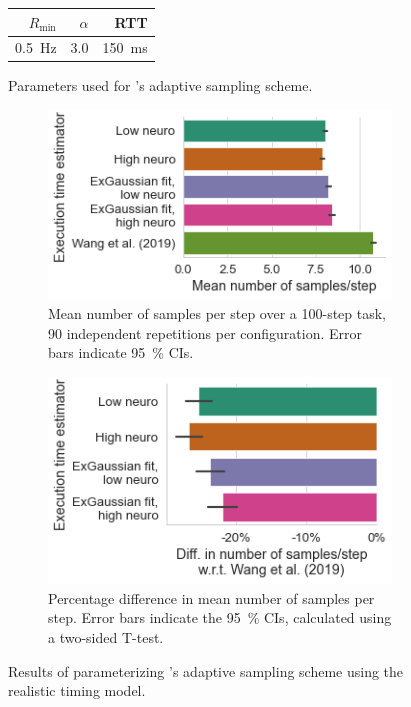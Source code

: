 \begin{figure}
    \centering
    \begin{subtable}[]{\columnwidth}
        \centering
        \begin{tabular}{rrr}
            \toprule
            \( R_\text{min} \) & \( \alpha \) & \ac{RTT} \\
            \midrule
            \SI{0.5}{\hertz} & \num{3.0} & \SI{150}{\milli\second} \\
            \bottomrule
        \end{tabular}
        \caption{Parameters used for \textcite{Wang2019Towards}'s adaptive sampling scheme.}
    \end{subtable}
    \begin{subfigure}[]{\columnwidth}
        \centering
        \includegraphics[width=.9\textwidth]{figs/new_model/sampling_junjue.png}
        \caption{%
            Mean number of samples per step over a \num{100}-step task, \num{90} independent repetitions per configuration.
            Error bars indicate \SI{95}{\percent} \acp{CI}.
        }
    \end{subfigure}
    \begin{subfigure}[]{\columnwidth}
        \centering
        \includegraphics[width=.9\textwidth]{figs/new_model/diff_sampling_junjue.png}
        \caption{%
            Percentage difference in mean number of samples per step.
            Error bars indicate the \SI{95}{\percent} \acp{CI}, calculated using a two-sided T-test.
        }
    \end{subfigure}
    \caption{Results of parameterizing \textcite{Wang2019Towards}'s adaptive sampling scheme using the realistic timing model.}\label{fig:samples}
\end{figure}


